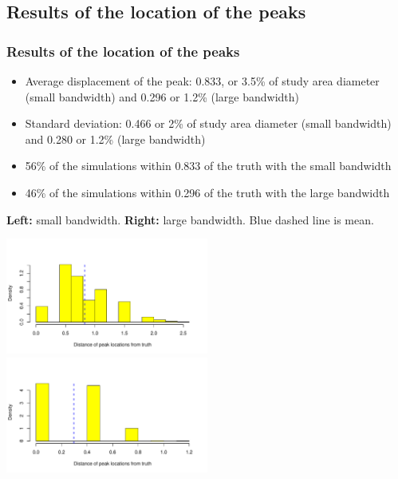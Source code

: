 \documentclass{beamer}
\theoremstyle{definition}
\begin{document}
\subsection{Results of the location of the peaks}
\begin{frame}\frametitle{Results of the location of the peaks}
    \footnotesize
    \begin{itemize}
        \item Average displacement of the peak: 0.833, or 3.5\% of study area diameter (small bandwidth) and 0.296 or 1.2\% (large bandwidth)
        \item Standard deviation: 0.466 or 2\% of study area diameter (small bandwidth) and 0.280 or 1.2\% (large bandwidth)
        \item 56\% of the simulations within 0.833 of the truth with the small bandwidth
        \item 46\% of the simulations within 0.296 of the truth with the large bandwidth
    \end{itemize}
    \begin{example}{\tiny{\textbf{Left:} small bandwidth. \textbf{Right:} large bandwidth. {\color{blue}Blue dashed} line is mean.}}
    \centerline{
        \label{fig:peaks-loations-hist}
        \centering
        \includegraphics[width=0.5\textwidth]{peaks-hist-locations-undersmooth}
        \includegraphics[width=0.5\textwidth]{peaks-hist-locations-oversmooth}
     }
    \end{example}
\end{frame}

\end{document}
